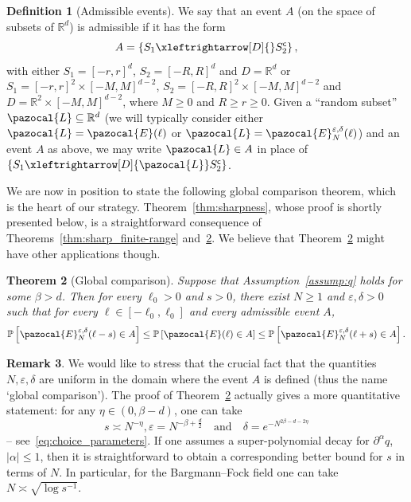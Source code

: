 \documentclass[10pt]{amsart}
\newtheorem{theo}{Theorem}[section]
\theoremstyle{definition}\newtheorem{defi}[theo]{Definition}\newtheorem{rema}[theo]{Remark}\newtheorem{exam}[theo]{Example}\newtheorem{exem}[theo]{Example}\newtheorem{nota}[theo]{Notation}
\renewcommand{\P}{\mathbb{P}}
\newcommand{\R}{\mathbb{R}}
\newcommand{\sfc}{\mathsf{c}}
\newcommand{\lr}[4]{#3\xleftrightarrow[#1]{#2} #4}
\begin{document}
\begin{defi}[Admissible events]\label{def:admissible}
We say that an event $A$ (on the space of subsets of $\R^d$) is admissible if it has the form
\[
A=\left\{\lr{D}{}{S_1}{S_2^{\sfc}}\right\},
\]
with either $S_1=[-r,r]^d$, $S_2=[-R,R]^d$ and $D=\R^d$ or $S_1=[-r,r]^2\times[-M,M]^{d-2}$, $S_2=[-R,R]^2\times[-M,M]^{d-2}$ and $D=\R^2\times [-M,M]^{d-2}$, where $M\geq0$ and $R\geq r\geq0$. Given a ``random subset'' $\pazocal{L}\subseteq\R^d$ (we will typically consider either $\pazocal{L}=\pazocal{E}(\ell)$ or $\pazocal{L}=\pazocal{E}_N^{\varepsilon,\delta}(\ell)$) and an event $A$ as above, we may write $\pazocal{L}\in A$ in place of $\{\lr{D}{\pazocal{L}}{S_1}{S_2^{\sfc}}\}$.
\end{defi}


We are now in position to state the following global comparison theorem, which is the heart of our strategy. Theorem~\ref{thm:sharpness}, whose proof is shortly presented below, is a straightforward consequence of Theorems~\ref{thm:sharp_finite-range} and~\ref{thm:comparison}. We believe that Theorem~\ref{thm:comparison} might have other applications though.

\begin{theo}[Global comparison]\label{thm:comparison}
Suppose that Assumption~\ref{assump:q} holds for some $\beta>d$. Then for every $\ell_0>0$ and $s>0$, there exist $N\geq1$ and $\varepsilon,\delta>0$ such that for every $\ell\in [-\ell_0,\ell_0]$ and every admissible event $A$,
\begin{equation}\label{eq:comparison}
\P\left[\pazocal{E}_N^{\varepsilon,\delta}(\ell-s)\in A\right]\leq \P\left[\pazocal{E}(\ell)\in A\right]\leq \P\left[\pazocal{E}_N^{\varepsilon,\delta}(\ell+s)\in A\right].
\end{equation}
\end{theo}

\begin{rema}\label{rmk:quantitative}
We would like to stress that the crucial fact that the quantities $N,\varepsilon,\delta$ are uniform in the domain where the event $A$ is defined (thus the name `global comparison'). The proof of Theorem~\ref{thm:comparison} actually gives a more quantitative statement: for any $\eta\in(0,\beta-d)$, one can take
\[
s\asymp N^{-\eta}, \varepsilon=N^{-\beta+\frac{d}{2}}\quad \text{and}\quad\delta=e^{-N^{2\beta-d-2\eta}}
\]
-- see~\eqref{eq:choice_parameters}. If one assumes a super-polynomial decay for $\partial^\alpha q$, $|\alpha|\leq1$, then it is straightforward to obtain a corresponding better bound for $s$ in terms of $N$. In particular, for the Bargmann--Fock field one can take $N\asymp \sqrt{\log s^{-1}}$.
\end{rema}
\end{document}
